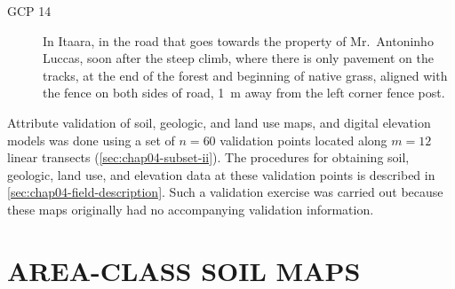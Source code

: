 \begin{description}
\item[GCP 14]
In Itaara, in the road that goes towards the property of Mr.~Antoninho Luccas, soon after the steep climb, 
where there is only pavement on the tracks, at the end of the forest and beginning of native grass, aligned 
with the fence on both sides of road, \SI{1}{\m} away from the left corner fence post.
\end{description}

Attribute validation of soil, geologic, and land use maps, and digital elevation models was done using a set 
of $n = 60$ validation points located along $m = 12$ linear transects (\autoref{sec:chap04-subset-ii}). The 
procedures for obtaining soil, geologic, land use, and elevation data at these validation points is described 
in \autoref{sec:chap04-field-description}. Such a validation exercise was carried out because these maps 
originally had no accompanying validation information.



\section{AREA-CLASS SOIL MAPS}
\label{sec:chap05-soil-maps}

